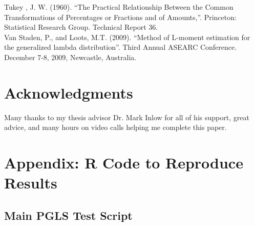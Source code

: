 \documentclass[12pt]{article}
\begin{document}
Tukey , J. W. (1960). ``The Practical Relationship Between the Common Transformations of Percentages or Fractions and of Amounts,''. Princeton: Statistical Research Group. Technical Report 36.\\

Van Staden, P., and Loots, M.T. (2009). ``Method of L-moment estimation for the generalized lambda distribution''. Third Annual ASEARC Conference. December 7-8, 2009, Newcastle, Australia.


\section*{Acknowledgments}
Many thanks to my thesis advisor Dr. Mark Inlow for all of his support, great advice, and many hours on video calls helping me complete this paper. 
\pagebreak
\section*{Appendix: R Code to Reproduce Results}

\subsection{Main PGLS Test Script}
\end{document}
